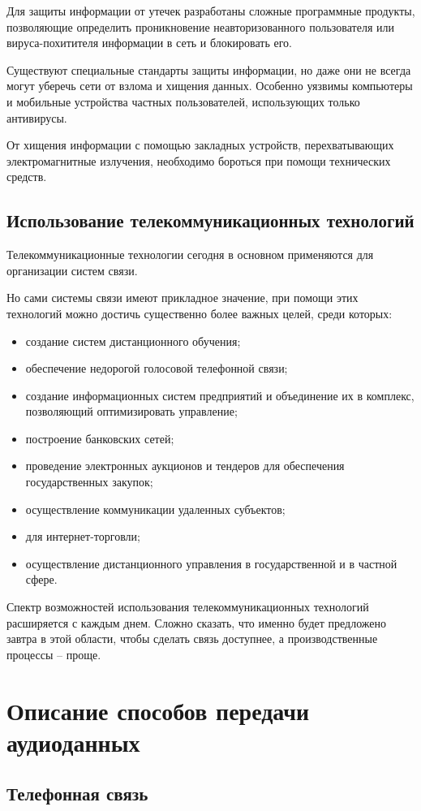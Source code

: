 \documentclass[a4paper]{report}
\begin{document}
Для защиты информации от утечек разработаны сложные программные продукты, позволяющие определить проникновение неавторизованного пользователя или вируса-похитителя информации в сеть и блокировать его.

Существуют специальные стандарты защиты информации, но даже они не всегда могут уберечь сети от взлома и хищения данных. Особенно уязвимы компьютеры и мобильные устройства частных пользователей, использующих только антивирусы.

От хищения информации с помощью закладных устройств, перехватывающих электромагнитные излучения, необходимо бороться при помощи технических средств.

\subsection{Использование телекоммуникационных технологий}
Телекоммуникационные технологии сегодня в основном применяются для организации систем связи.

Но сами системы связи имеют прикладное значение, при помощи этих технологий можно достичь существенно более важных целей, среди которых:
\begin{itemize}
\item создание систем дистанционного обучения;
\item обеспечение недорогой голосовой телефонной связи;
\item создание информационных систем предприятий и объединение их в комплекс, позволяющий оптимизировать управление;
\item построение банковских сетей;
\item проведение электронных аукционов и тендеров для обеспечения государственных закупок;
\item осуществление коммуникации удаленных субъектов;
\item для интернет-торговли;
\item осуществление дистанционного управления в государственной и в частной сфере.
\end{itemize}

Спектр возможностей использования телекоммуникационных технологий расширяется с каждым днем. Сложно сказать, что именно будет предложено завтра в этой области, чтобы сделать связь доступнее, а производственные процессы – проще.

\section{Описание способов передачи аудиоданных}
\subsection{Телефонная связь}
\end{document}
